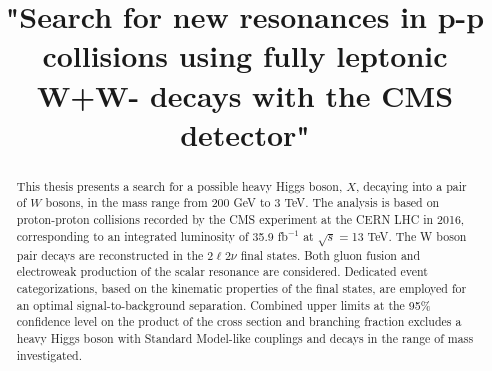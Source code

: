 \documentclass[PhD,binding=0.6cm]{../sapthesis}
\title{"Search for new resonances in p-p collisions using fully leptonic W+W- decays with the CMS detector" }
\begin{document}
\newcommand{\aMC}{\textsc{MadGraph}\xspace}
\newcommand{\qqbar}{$q \bar{q}$}
\newcommand{\POWHEG} {{\textsc{powheg}}\xspace}

\frontmatter

\maketitle

\dedication{  dedica a...}



\begin{abstract}
This thesis presents a search for a possible heavy Higgs boson, $X$, decaying into a pair of $W$
bosons, in the mass range from 200 GeV to 3 TeV. The analysis is based on proton-proton 
collisions recorded by the CMS experiment at the CERN LHC in 2016, corresponding to an integrated luminosity of 
35.9 fb$^{-1}$  at $\sqrt{s}=$13 TeV. The W boson pair decays are reconstructed in the $2\ell 2\nu$  final states. 
Both gluon fusion and electroweak production of the scalar resonance are considered. 
Dedicated event categorizations, based on the kinematic properties of the final states, are employed for an
optimal signal-to-background separation. 
Combined upper limits at the 95\% confidence level on the product of the cross section and branching fraction excludes a heavy Higgs boson  with Standard Model-like couplings and decays in the range of mass investigated. 
\end{abstract}


\tableofcontents

\end{document}
